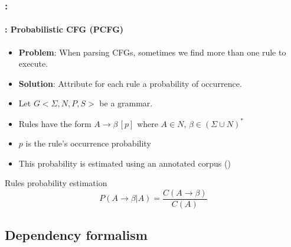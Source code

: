 \documentclass[xcolor=table]{beamer}
\begin{document}
\begin{frame}
	\frametitle{\insertshortsubtitle: \insertsection}
	\framesubtitle{\insertsubsection: Probabilistic CFG (PCFG)}

	\begin{itemize}
		\item \textbf{Problem}: When parsing CFGs, sometimes we find more than one rule to execute.
		\item \textbf{Solution}: Attribute for each rule a probability of occurrence.
		\item Let $G <\Sigma, N, P, S>$ be a grammar.
		\item Rules have the form $A \rightarrow \beta\, [p] \text{ where } A \in N,\, \beta \in (\Sigma \cup N)^*$
		\item $p$ is the rule's occurrence probability
		\item This probability is estimated using an annotated corpus ()
	\end{itemize}
	
	\begin{block}{Rules probability estimation}
		\[
		P(A \rightarrow \beta | A) = \frac{C(A \rightarrow \beta)}{C(A)}
		\]
	\end{block}

\end{frame}

\subsection{Dependency formalism}
\end{document}
